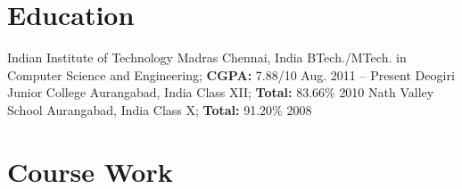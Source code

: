 \documentclass[letterpaper,11pt]{resume}
\author{Siddhant Sunilkumar Mutha}
\begin{document}
\resumeheader
\section{Education}
\begin{itemize}
    \credential
    {{Indian Institute of Technology Madras}}
    {Chennai, India}
    {{BTech./MTech. in Computer Science
      and Engineering}; {{\bf CGPA:} 7.88/10}
      }
    {Aug. 2011 -- Present}
    \bigskip
   \credential
    {{Deogiri Junior College}}
    {Aurangabad, India}
    {{Class XII}; {{\bf Total:} 83.66\%}
     }
    {2010}
   \bigskip
   \credential
    {{Nath Valley School}}
    {Aurangabad, India}
    {{Class X}; {{\bf Total:} 91.20\%}}
    {2008}
   \bigskip 

\end{itemize}
\section{Course Work}
\end{document}
